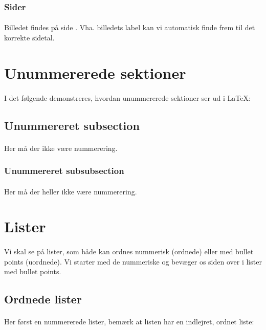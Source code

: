 \documentclass{article}
\begin{document}
        \subsubsection{Sider}
        \paragraph{}
        Billedet findes på side \pageref{fig:1}. Vha. billedets label kan vi automatisk finde frem til det korrekte sidetal.
\section{Unummererede sektioner}
\paragraph{}
I det følgende demonstreres, hvordan unummererede sektioner ser ud i \LaTeX:
\subsection*{Unummereret subsection}
\paragraph{}
    Her må der ikke være nummerering.
\subsubsection*{Unummereret subsubsection}
\paragraph{}
    Her må der heller ikke være nummerering.
\section{Lister}
\paragraph{}
Vi skal se på lister, som både kan ordnes nummerisk (ordnede) eller med bullet points (uordnede). Vi starter med de nummeriske og bevæger os siden over i lister med bullet points.
\subsection{Ordnede lister}
\paragraph{} 
Her først en nummererede lister, bemærk at listen har en indlejret, ordnet liste:
\end{document}
